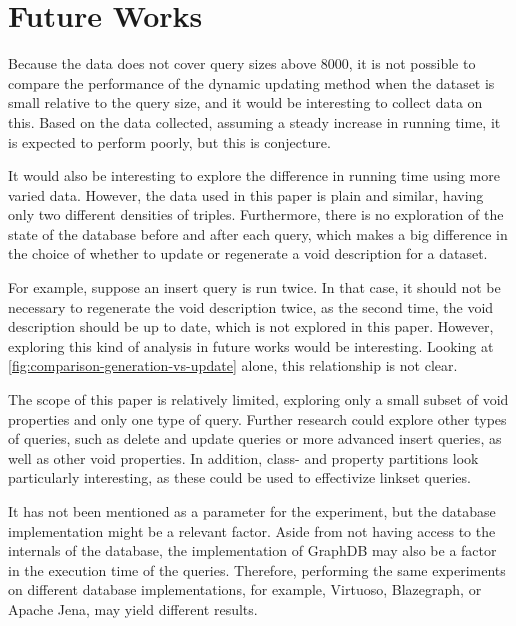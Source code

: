 \section{Future Works}\label{sec:future-works}
Because the data does not cover query sizes above 8000, it is not possible to compare the performance of the dynamic updating method when the dataset is small relative to the query size, and it would be interesting to collect data on this. Based on the data collected, assuming a steady increase in running time, it is expected to perform poorly, but this is conjecture.

It would also be interesting to explore the difference in running time using more varied data. However, the data used in this paper is plain and similar, having only two different densities of triples. Furthermore, there is no exploration of the state of the database before and after each query, which makes a big difference in the choice of whether to update or regenerate a \gls{void} description for a dataset.

For example, suppose an insert query is run twice. In that case, it should not be necessary to regenerate the \gls{void} description twice, as the second time, the \gls{void} description should be up to date, which is not explored in this paper. However, exploring this kind of analysis in future works would be interesting. Looking at \autoref{fig:comparison-generation-vs-update} alone, this relationship is not clear.

The scope of this paper is relatively limited, exploring only a small subset of \gls{void} properties and only one type of query. Further research could explore other types of queries, such as delete and update queries or more advanced insert queries, as well as other \gls{void} properties. In addition, class- and property partitions look particularly interesting, as these could be used to effectivize linkset queries.

It has not been mentioned as a parameter for the experiment, but the database implementation might be a relevant factor. Aside from not having access to the internals of the database, the implementation of GraphDB may also be a factor in the execution time of the queries. Therefore, performing the same experiments on different database implementations, for example, Virtuoso, Blazegraph, or Apache Jena, may yield different results.